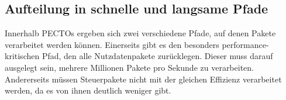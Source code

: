 \documentclass[a4paper, 11pt, ngerman, fleqn]{article}
\begin{document}
\subsection{Aufteilung in schnelle und langsame Pfade}

Innerhalb PECTOs ergeben sich zwei verschiedene Pfade, auf denen Pakete verarbeitet werden können.
Einerseits gibt es den besonders performance-kritischen Pfad, den alle Nutzdatenpakete zurücklegen. 
Dieser muss darauf ausgelegt sein, mehrere Millionen Pakete pro Sekunde zu verarbeiten. 
Andererseits müssen Steuerpakete nicht mit der gleichen Effizienz verarbeitet werden, da es von ihnen deutlich weniger gibt.

  
\end{document}
